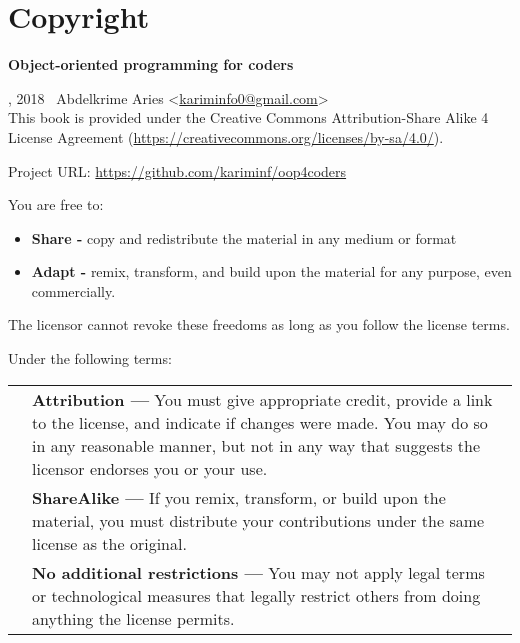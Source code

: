 \documentclass[12pt]{book}
\begin{document}
\fi

\chapter*{Copyright}

\begin{center}
	{\Huge \textbf{Object-oriented programming for coders}}
\end{center}


, 2018  \textcopyright\ Abdelkrime Aries <\href{mailto://kariminfo0@gmail.com}{kariminfo0@gmail.com}> \\[0.5cm]
This book is provided under the Creative Commons Attribution-Share Alike 4 License Agreement (\url{https://creativecommons.org/licenses/by-sa/4.0/}).

\vspace{0.5cm}
\noindent
Project URL: \url{https://github.com/kariminf/oop4coders}

\vspace{1cm}

\scriptsize %
\vspace{1cm}
\noindent
You are free to:
\begin{itemize}
\item \textbf{Share -} copy and redistribute the material in any medium or format
\item \textbf{Adapt -} remix, transform, and build upon the material for any purpose, even commercially.
\end{itemize}
The licensor cannot revoke these freedoms as long as you follow the license terms.

\vspace{1cm}
\noindent
Under the following terms:\\
\begin{tabular}{m{}m{}}
%
& %
\textbf{Attribution —} You must give appropriate credit, provide a link to the license, and indicate if changes were made. You may do so in any reasonable manner, but not in any way that suggests the licensor endorses you or your use. \\
%
& %
\textbf{ShareAlike —} If you remix, transform, or build upon the material, you must distribute your contributions under the same license as the original.\\
%
&
\textbf{No additional restrictions —} You may not apply legal terms or technological measures that legally restrict others from doing anything the license permits.
%
\end{tabular}
\end{document}
